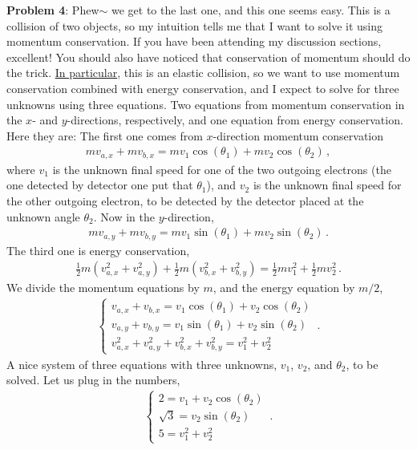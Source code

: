 \documentclass[11pt]{article}
\begin{document}
\newpage

\noindent\textbf{Problem 4}: Phew$\sim$ we get to the last one, and this one seems easy. This is a collision of two objects, so my intuition tells me that I want to solve it using momentum conservation. If you have been attending my discussion sections, excellent! You should also have noticed that conservation of momentum should do the trick. \underline{In particular}, this is an elastic collision, so we want to use momentum conservation combined with energy conservation, and I expect to solve for three unknowns using three equations. Two equations from momentum conservation in the $x$- and $y$-directions, respectively, and one equation from energy conservation.\\

Here they are: The first one comes from $x$-direction momentum conservation
\begin{align*}
mv_{a,x} + mv_{b,x} = mv_1\cos(\theta_1)+ mv_2\cos(\theta_2)\,,
\end{align*}
where $v_1$ is the unknown final speed for one of the two outgoing electrons (the one detected by detector one put that $\theta_1$), and $v_2$ is the unknown final speed for the other outgoing electron, to be detected by the detector placed at the unknown angle $\theta_2$. Now in the $y$-direction, 
\begin{align*}
mv_{a,y} + mv_{b,y} = mv_1\sin(\theta_1)+ mv_2\sin(\theta_2)\,.
\end{align*}
The third one is energy conservation, 
\begin{align*}
\frac{1}{2}m(v_{a,x}^2 + v_{a,y}^2)+
\frac{1}{2}m(v_{b,x}^2 + v_{b,y}^2) =  
\frac{1}{2}mv_1^2+
\frac{1}{2}mv_2^2\,.
\end{align*}
We divide the momentum equations by $m$, and the energy equation by $m/2$, 
\begin{align*}
\begin{cases}
v_{a,x} + v_{b,x} = v_1\cos(\theta_1)+ v_2\cos(\theta_2)\\
v_{a,y} + v_{b,y} = v_1\sin(\theta_1)+ v_2\sin(\theta_2)\\
v_{a,x}^2 + v_{a,y}^2+
v_{b,x}^2 + v_{b,y}^2 =  
v_1^2+
v_2^2
\end{cases}\,.
\end{align*} 
A nice system of three equations with three unknowns, $v_1$, $v_2$, and $\theta_2$, to be solved. Let us plug in the numbers, 
\begin{align*}
\begin{cases} 
2 = v_1 + v_2\cos(\theta_2)\\
\sqrt{3} = v_2\sin(\theta_2) \\
5 = v_1^2 + v_2^2
\end{cases}\,.
\end{align*} 
\end{document}
